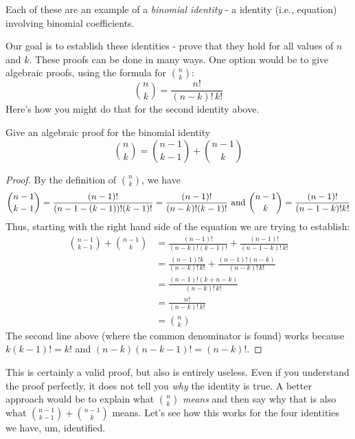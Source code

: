 \documentclass[12pt]{article}
\begin{document}
Each of these are an example of a {\em binomial identity} - a identity (i.e., equation) involving binomial coefficients.

Our goal is to establish these identities - prove that they hold for all values of $n$ and $k$.  These proofs can be done in many ways.  One option would be to give algebraic proofs, using the formula for ${n \choose k}$:
\[{n \choose k} = \frac{n!}{(n-k)!\,k!}\]
Here's how you might do that for the second identity above.

\begin{example}
  Give an algebraic proof for the binomial identity
  \[{n \choose k} = {n-1\choose k-1} + {n-1 \choose k}\]
  \begin{proof}
    By the definition of ${n \choose k}$, we have
    \[{n-1 \choose k-1} = \frac{(n-1)!}{(n-1-(k-1))!(k-1)!} = \frac{(n-1)!}{(n-k)!(k-1)!} \hfill \mbox{ and } {n-1 \choose k} = \frac{(n-1)!}{(n-1-k)!k!}\]
    Thus, starting with the right hand side of the equation we are trying to establish:
    \begin{align*}
      {n-1 \choose k-1} + {n-1 \choose k} & = \frac{(n-1)!}{(n-k)!(k-1)!}+ \frac{(n-1)!}{(n-1-k)!\,k!}\\
      & = \frac{(n-1)!k}{(n-k)!\,k!} + \frac{(n-1)!(n-k)}{(n-k)!\,k!}\\
      & = \frac{(n-1)!(k+n-k)}{(n-k)!\,k!} \\
      & = \frac{n!}{(n-k)!\, k!} \\
      & = {n \choose k}
    \end{align*}
    The second line above (where the common denominator is found) works because $k(k-1)! = k!$ and $(n-k)(n-k-1)! = (n-k)!$.
  \end{proof}

\end{example}

This is certainly a valid proof, but also is entirely useless.  Even if you understand the proof perfectly, it does not tell you {\em why} the identity is true.  A better approach would be to explain what ${n \choose k}$ {\em means} and then say why that is also what ${n-1 \choose k-1} + {n-1 \choose k}$ means.  Let's see how this works for the four identities we have, um, identified.
\end{document}
